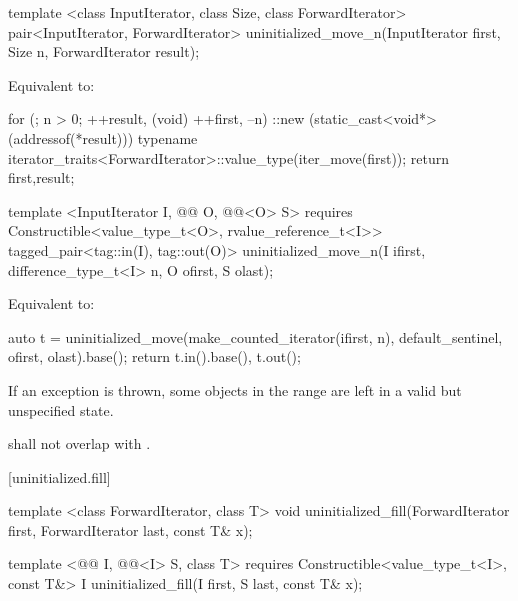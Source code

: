 {\color{remclr}
\begin{codeblock}
template <class InputIterator, class Size, class ForwardIterator>
  pair<InputIterator, ForwardIterator>
    uninitialized_move_n(InputIterator first, Size n, ForwardIterator result);
\end{codeblock}

\setcounter{Paras}{2}
\pnum
\effects Equivalent to:
\begin{codeblock}
        for (; n > 0; ++result, (void) ++first, --n)
          ::new (static_cast<void*>(addressof(*result)))
            typename iterator_traits<ForwardIterator>::value_type(iter_move(first));
        return {first,result};
\end{codeblock}
} %

{\color{addclr}
\begin{codeblock}
template <InputIterator I, @@ O, @@<O> S>
requires
  Constructible<value_type_t<O>, rvalue_reference_t<I>>
tagged_pair<tag::in(I), tag::out(O)>
  uninitialized_move_n(I ifirst, difference_type_t<I> n, O ofirst, S olast);
\end{codeblock}

\pnum
\effects Equivalent to:
\begin{codeblock}
    auto t = uninitialized_move(make_counted_iterator(ifirst, n),
                                default_sentinel{}, ofirst, olast).base();
    return {t.in().base(), t.out()};
\end{codeblock}
} %

\setcounter{Paras}{3}
\pnum
\remarks If an exception is thrown, some objects in the range  are left
in a valid\added{,} but unspecified state.

{\color{addclr}
\setcounter{Paras}{5}
\pnum
\requires {} shall not overlap with .

} %

[uninitialized.fill]{}
{\color{remclr}
\begin{codeblock}
template <class ForwardIterator, class T>
  void uninitialized_fill(ForwardIterator first, ForwardIterator last,
                          const T& x);
\end{codeblock}
} %

{\color{addclr}
\begin{codeblock}
template <@@ I, @@<I> S, class T>
requires
  Constructible<value_type_t<I>, const T&>
I uninitialized_fill(I first, S last, const T& x);
\end{codeblock}
} %


